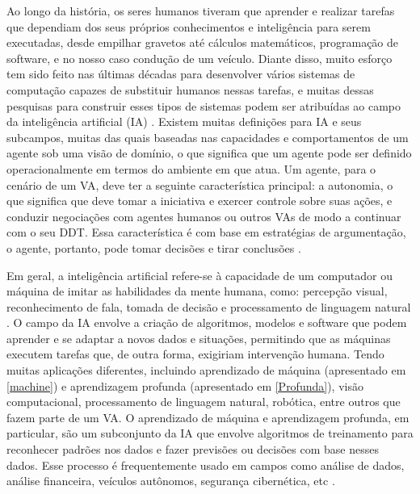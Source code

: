 Ao longo da história, os seres humanos tiveram que aprender e realizar tarefas que dependiam dos seus próprios conhecimentos e inteligência para serem executadas, desde empilhar gravetos até cálculos matemáticos, programação de software, e no nosso caso condução de um veículo. Diante disso, muito esforço tem sido feito nas últimas décadas para desenvolver vários sistemas de computação capazes de substituir humanos nessas tarefas, e muitas dessas pesquisas para construir esses tipos de sistemas podem ser atribuídas ao campo da inteligência artificial (IA) \cite{caio}. 
Existem muitas definições para IA e seus subcampos, muitas das quais baseadas nas capacidades e comportamentos de um agente sob uma visão de domínio, o que significa que um agente pode ser definido operacionalmente em termos do ambiente em que atua.
Um agente, para o cenário de um VA, deve ter a seguinte característica principal: a autonomia, o que significa que deve tomar a iniciativa e exercer controle sobre suas ações, e conduzir negociações com agentes humanos ou outros VAs de modo a continuar com o seu DDT.
Essa característica é com base em estratégias de argumentação, o agente, portanto, pode tomar decisões e tirar conclusões \cite{software-ia}.

Em geral, a inteligência artificial refere-se à capacidade de um computador ou máquina de imitar as habilidades da mente humana, como: percepção visual, reconhecimento de fala, tomada de decisão e processamento de linguagem natural \cite{software-ia}. O campo da IA envolve a criação de algoritmos, modelos e software que podem aprender e se adaptar a novos dados e situações, permitindo que as máquinas executem tarefas que, de outra forma, exigiriam intervenção humana. Tendo muitas aplicações diferentes, incluindo aprendizado de máquina (apresentado em \ref{machine}) e aprendizagem profunda (apresentado em \ref{Profunda}), visão computacional, processamento de linguagem natural, robótica, entre outros que fazem parte de um VA. O aprendizado de máquina e aprendizagem profunda, em particular, são um subconjunto da IA que envolve algoritmos de treinamento para reconhecer padrões nos dados e fazer previsões ou decisões com base nesses dados. Esse processo é frequentemente usado em campos como análise de dados, análise financeira, veículos autônomos, segurança cibernética, etc \cite{software-review, software-cnn}.


 \label{machine}

